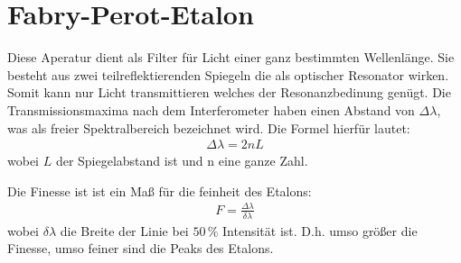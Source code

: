 
\newpage
\section{Fabry-Perot-Etalon}

Diese Aperatur dient als Filter für Licht einer ganz bestimmten Wellenlänge.
Sie besteht aus zwei teilreflektierenden Spiegeln die als optischer Resonator wirken. Somit kann nur Licht transmittieren welches der Resonanzbedinung genügt. Die Transmissionsmaxima nach dem Interferometer haben einen Abstand von $\Delta \lambda$, was als freier Spektralbereich bezeichnet wird. Die Formel hierfür lautet:
\begin{align}
    \Delta \lambda = 2nL
\end{align}
wobei $L$ der Spiegelabstand ist und n eine ganze Zahl.

Die Finesse ist ist ein Maß für die feinheit des Etalons:
\begin{align}
    F = \frac{\Delta \lambda}{\delta \lambda}
\end{align}
wobei $\delta \lambda$ die Breite der Linie bei $50 \, \%$ Intensität ist. D.h. umso größer die Finesse, umso feiner sind die Peaks des Etalons.
